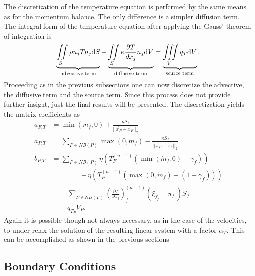    The discretization of the temperature equation is performed by the same means as for the momentum balance. The only difference is a simpler diffusion term. The integral form of the temperature equation after applying the Gauss' theorem of integration is
    \begin{displaymath}
    \underbrace{ \iint\limits_S \rho u_j T n_j \mathrm{d}S }_{\text{advective term}}
    - \underbrace{ \iint\limits_S \kappa \frac{\partial T}{\partial x_j} n_j \mathrm{d}V }_{\text{diffusive term}}
    = \underbrace{\iiint\limits_V \vphantom{\frac{ T}{ x_j} } q_T \mathrm{d}V }_{\text{source term}}.
    \end{displaymath}
    Proceeding as in the previous subsections one can now discretize the advective, the diffusive term and the source term. Since this process does not provide further insight, just the final results will be presented. The discretization yields the matrix coefficients as
    \begin{subequations}
      \begin{align}
        a_{F,T} &= \min(\dot{m}_f,0) + \frac{\kappa S_f}{||\vec{x}_P - \vec{x}_F||_2} \\[1em]
        a_{P,T} &= \sum_{F \in NB(P)}\max(0,\dot{m}_f) - \frac{\kappa S_f}{||\vec{x}_P - \vec{x}_F||_2} \\[1em]
        b_{P,T} &= \sum_{F \in NB(P)} \eta  \left(T_F^{(n-1)} \left( \min(\dot{m}_f,0) - \gamma_f \right)\right) \nonumber \\
                &\quad \quad \quad  \quad+ \eta \left( T_{P}^{(n-1)} \left( \max(0,\dot{m}_f) - \left(1 - \gamma_f\right) \right)\right) \nonumber \\[0.5em]
                &\quad + \sum_{F \in NB(P)} \left( \frac{\partial T}{\partial x_j}\right)_f^{(n-1)} \left(\xi_{f_j} - n_{f_j}\right)S_f \nonumber \\[0.5em]
                &\quad + q_{T_P} V_P.
      \end{align}
    \end{subequations}
    Again it is possible though not always necessary, as in the case of the velocities, to under-relax the solution of the resulting linear system with a factor \(\alpha_T\). This can be accomplished as shown in the previous sections.


  \subsection{Boundary Conditions}

